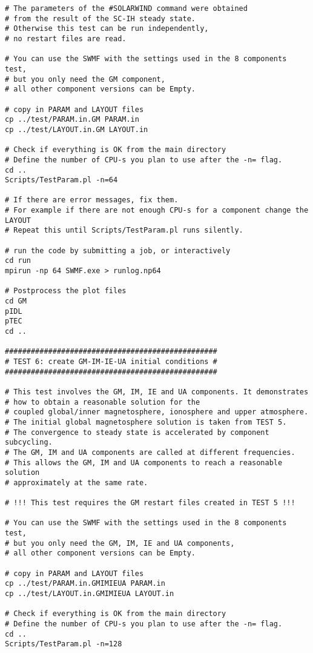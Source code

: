 \begin{verbatim}
# The parameters of the #SOLARWIND command were obtained
# from the result of the SC-IH steady state. 
# Otherwise this test can be run independently, 
# no restart files are read.

# You can use the SWMF with the settings used in the 8 components test, 
# but you only need the GM component,
# all other component versions can be Empty.

# copy in PARAM and LAYOUT files
cp ../test/PARAM.in.GM PARAM.in
cp ../test/LAYOUT.in.GM LAYOUT.in

# Check if everything is OK from the main directory
# Define the number of CPU-s you plan to use after the -n= flag.
cd ..
Scripts/TestParam.pl -n=64

# If there are error messages, fix them. 
# For example if there are not enough CPU-s for a component change the LAYOUT
# Repeat this until Scripts/TestParam.pl runs silently.

# run the code by submitting a job, or interactively
cd run
mpirun -np 64 SWMF.exe > runlog.np64

# Postprocess the plot files
cd GM
pIDL
pTEC
cd ..

#################################################
# TEST 6: create GM-IM-IE-UA initial conditions #
#################################################

# This test involves the GM, IM, IE and UA components. It demonstrates
# how to obtain a reasonable solution for the 
# coupled global/inner magnetosphere, ionosphere and upper atmosphere.
# The initial global magnetosphere solution is taken from TEST 5.
# The convergence to steady state is accelerated by component subcycling.
# The GM, IM and UA components are called at different frequencies.
# This allows the GM, IM and UA components to reach a reasonable solution
# approximately at the same rate.

# !!! This test requires the GM restart files created in TEST 5 !!!

# You can use the SWMF with the settings used in the 8 components test, 
# but you only need the GM, IM, IE and UA components,
# all other component versions can be Empty.

# copy in PARAM and LAYOUT files
cp ../test/PARAM.in.GMIMIEUA PARAM.in
cp ../test/LAYOUT.in.GMIMIEUA LAYOUT.in

# Check if everything is OK from the main directory
# Define the number of CPU-s you plan to use after the -n= flag.
cd ..
Scripts/TestParam.pl -n=128


\end{verbatim}
